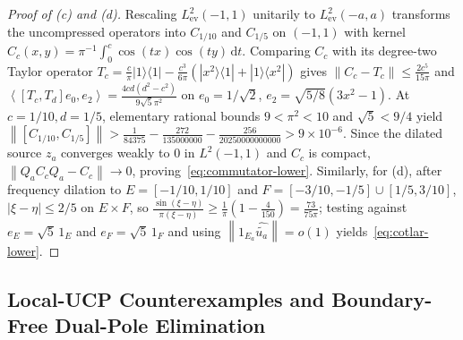 \documentclass[11pt]{article}
\theoremstyle{remark}
\newcommand{\norm}[1]{\left\lVert #1\right\rVert}
\newcommand{\ip}[2]{\left\langle #1,#2\right\rangle}
\newcommand{\dd}{\mathrm d}
\begin{document}
\begin{proof}[Proof of (c) and (d)]
Rescaling $L^2_{\mathrm{ev}}(-1,1)$ unitarily to $L^2_{\mathrm{ev}}(-a,a)$ transforms the uncompressed operators into $C_{1/10}$ and $C_{1/5}$ on $(-1,1)$ with kernel $C_c(x,y) = \pi^{-1}\int_0^c \cos(tx)\cos(ty)\,\dd t$. Comparing $C_c$ with its degree-two Taylor operator $T_c = \frac{c}{\pi}|1\rangle\langle 1| - \frac{c^3}{6\pi}(|x^2\rangle\langle 1| + |1\rangle\langle x^2|)$ gives $\norm{C_c - T_c} \le \frac{2c^5}{15\pi}$ and $\ip{[T_c,T_d]e_0}{e_2} = \frac{4cd(d^2-c^2)}{9\sqrt{5}\pi^2}$ on $e_0 = 1/\sqrt{2}$, $e_2 = \sqrt{5/8}(3x^2-1)$. At $c=1/10, d=1/5$, elementary rational bounds $9 < \pi^2 < 10$ and $\sqrt{5} < 9/4$ yield $\norm{[C_{1/10},C_{1/5}]} > \frac{1}{84375} - \frac{272}{135000000} - \frac{256}{20250000000000} > 9 \times 10^{-6}$. Since the dilated source $z_a$ converges weakly to $0$ in $L^2(-1,1)$ and $C_c$ is compact, $\norm{Q_a C_c Q_a - C_c} \to 0$, proving~\eqref{eq:commutator-lower}. Similarly, for (d), after frequency dilation to $E = [-1/10, 1/10]$ and $F = [-3/10, -1/5] \cup [1/5, 3/10]$, $|\xi - \eta| \le 2/5$ on $E \times F$, so $\frac{\sin(\xi-\eta)}{\pi(\xi-\eta)} \ge \frac{1}{\pi}(1 - \frac{4}{150}) = \frac{73}{75\pi}$; testing against $e_E = \sqrt{5}\,1_E$ and $e_F = \sqrt{5}\,1_F$ and using $\norm{1_{E_a}\widehat{\widetilde{u_a}}} = o(1)$ yields~\eqref{eq:cotlar-lower}.
\end{proof}

\subsection{Local-UCP Counterexamples and Boundary-Free Dual-Pole Elimination}
\end{document}

